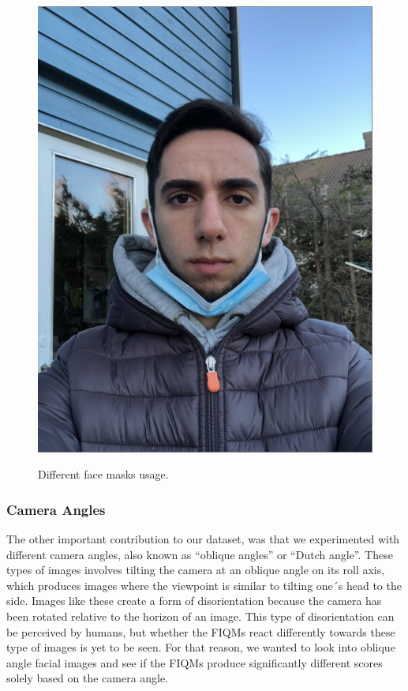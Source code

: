 \begin{figure}[h]
        {\includegraphics[scale = 0.18]{figures/1152.png}\hspace{0.0cm}}
    \caption{Different face masks usage.}
    \label{fig:masks}
\end{figure}

\subsubsection*{Camera Angles}
The other important contribution to our dataset, was that we experimented with different camera angles, also known as ``oblique angles'' or ``Dutch angle''. These types of images involves tilting the camera at an oblique angle on its roll axis, which produces images where the viewpoint is similar to tilting one´s head to the side. Images like these create a form of disorientation because the camera has been rotated relative to the horizon of an image. This type of disorientation can be perceived by humans, but whether the FIQMs react differently towards these type of images is yet to be seen. For that reason, we wanted to look into oblique angle facial images and see if the FIQMs produce significantly different scores solely based on the camera angle. 

